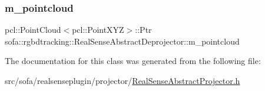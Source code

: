 \mbox{\label{classsofa_1_1rgbdtracking_1_1_real_sense_abstract_deprojector_a3317c507cc889b1537c708abb50196da}} 
\subsubsection{\texorpdfstring{m\+\_\+pointcloud}{m\_pointcloud}}
{\footnotesize\ttfamily pcl\+::\+Point\+Cloud$<$pcl\+::\+Point\+X\+YZ$>$\+::Ptr sofa\+::rgbdtracking\+::\+Real\+Sense\+Abstract\+Deprojector\+::m\+\_\+pointcloud}



The documentation for this class was generated from the following file\+:\begin{DoxyCompactItemize}
\item 
src/sofa/realsenseplugin/projector/\hyperlink{_real_sense_abstract_projector_8h}{Real\+Sense\+Abstract\+Projector.\+h}\end{DoxyCompactItemize}

